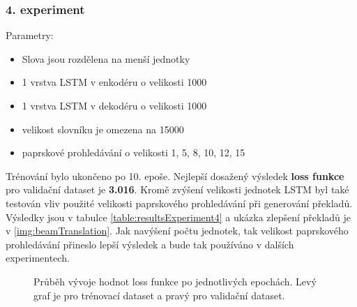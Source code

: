 \subsubsection{4. experiment}\label{experiment4}
Parametry:
\begin{itemize}
  \item Slova jsou rozdělena na menší jednotky
  \item 1 vrstva LSTM v enkodéru o velikosti 1000
  \item 1 vrstva LSTM v dekodéru o velikosti 1000
  \item velikost slovníku je omezena na 15000
  \item paprskové prohledávání o velikosti 1, 5, 8, 10, 12, 15
\end{itemize}

Trénování bylo ukončeno po 10. epoše. Nejlepší dosažený výsledek \textbf{loss funkce} pro validační dataset je \textbf{3.016}. Kromě zvýšení velikosti jednotek LSTM byl také testován vliv použité velikosti paprskového prohledávání při generování překladů. Výsledky jsou v tabulce \ref{table:resultsExperiment4} a ukázka zlepšení překladů je v \ref{img:beamTranslation}. Jak navýšení počtu jednotek, tak velikost paprskového prohledávání přineslo lepší výsledek a bude tak používáno v dalších experimentech.

\begin{figure}[H]
    \begin{center}
    \end{center}
	\caption{Průběh vývoje hodnot loss funkce po jednotlivých epochách. Levý graf je pro trénovací dataset a pravý pro validační dataset.}
\end{figure}

